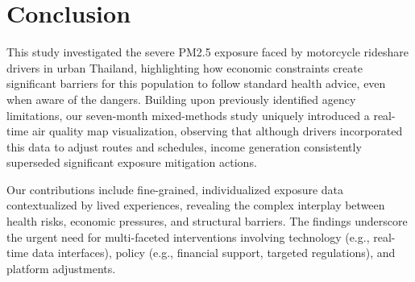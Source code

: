 \section{Conclusion}

This study investigated the severe PM2.5 exposure faced by motorcycle rideshare drivers in urban Thailand, 
highlighting how economic constraints create significant barriers for this population to follow standard health advice, even when aware of the dangers.
Building upon previously identified agency limitations, our seven-month mixed-methods study uniquely introduced a real-time air quality map visualization,
observing that although drivers incorporated this data to adjust routes and schedules,
income generation consistently superseded significant exposure mitigation actions.

Our contributions include fine-grained, individualized exposure data contextualized by lived experiences, revealing the complex interplay between health risks, economic pressures, and structural barriers.
The findings underscore the urgent need for multi-faceted interventions involving technology (e.g., real-time data interfaces), policy (e.g., financial support, targeted regulations), and platform adjustments.
